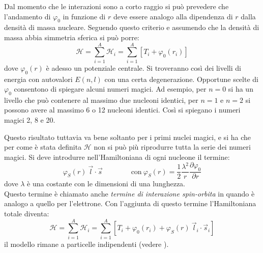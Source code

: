 Dal momento che le interazioni sono a corto raggio si può prevedere che 
l'andamento di $\varphi_0$ in funzione di $r$ deve essere analogo alla 
dipendenza di $r$ dalla densità di massa nucleare. Seguendo questo criterio e 
assumendo che la densità di massa abbia simmetria sferica si può porre:
\begin{equation}
\mathcal{H} = \sum_{i=1}^A \mathcal{H}_i = \sum_{i=1}^A \left[ T_i + 
\varphi_0{(r_i)} \right] 
\end{equation}
dove $\varphi_0(r)$ è adesso un potenziale centrale. Si troveranno così dei 
livelli di energia con autovalori $E{(n, l)}$ con una certa degenerazione. 
Opportune scelte di $\varphi_0$ consentono di spiegare alcuni numeri magici. Ad 
esempio, per $n = 0$ si ha un livello che può contenere al massimo due 
nucleoni identici, per $n = 1$ e $n = 2$ si possono avere al massimo 6 o 12 
nucleoni identici. Così si spiegano i numeri magici 2, 8 e 20.

Questo risultato tuttavia va bene soltanto per i primi nuclei magici, e si ha 
che per come è stata definita $\mathcal{H}$ non si può più riprodurre tutta 
la serie dei numeri magici. Si deve introdurre nell'Hamiltoniana di ogni 
nucleone il termine:
\begin{equation}
\varphi_S{(r)}\ \vec{l} \cdot \vec{s} \qquad \qquad\text{con}\ \varphi_S{(r)} = 
\frac{1}{2} \frac{\lambda^2}{r} \frac{\partial \varphi_0}{\partial r}
\end{equation}
dove $\lambda$ è una costante con le dimensioni di una lunghezza.
\\
Questo termine è chiamato anche \textit{termine di interazione spin-orbita} in 
quando è analogo a quello per l'elettrone. Con l'aggiunta di questo termine 
l'Hamiltoniana totale diventa:
\begin{equation}
\mathcal{H} = \sum_{i=1}^A \mathcal{H}_i = \sum_{i=1}^A \left[ T_i + 
\varphi_0{(r_i)} + \varphi_S{(r)}\ \vec{l}_i \cdot \vec{s}_i \right] 
\end{equation}
il modello rimane a particelle indipendenti (vedere \pageref{allegato_6}).

